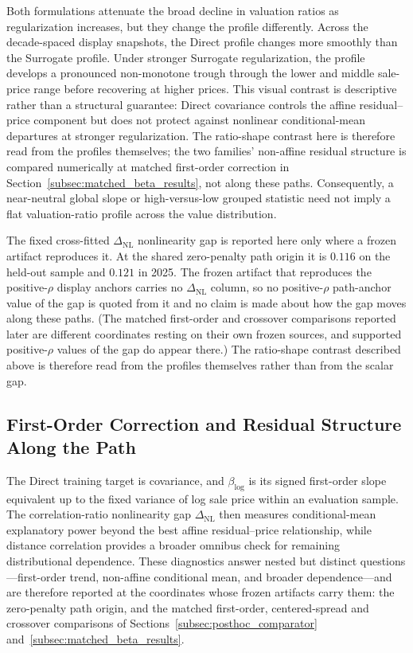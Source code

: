 \documentclass[10pt]{article}
\theoremstyle{definition}
\newcommand{\1}{\mathbf{1}}
\begin{document}
Both formulations attenuate the broad decline in valuation ratios as regularization
increases, but they change the profile differently.
Across the decade-spaced display snapshots, the Direct profile changes more smoothly than the Surrogate profile. Under stronger Surrogate regularization, the profile
develops a pronounced non-monotone trough through the lower and middle sale-price
range before recovering at higher prices. This visual contrast is descriptive rather than a structural guarantee: Direct covariance controls the affine residual--price component but does not protect against nonlinear conditional-mean departures at stronger regularization. The ratio-shape contrast here is therefore read from the profiles themselves; the two families' non-affine residual structure is compared numerically at matched first-order correction in Section~\ref{subsec:matched_beta_results}, not along these paths.
Consequently, a near-neutral global slope or high-versus-low grouped statistic need not imply a flat valuation-ratio profile across the value distribution.

The fixed cross-fitted $\Delta_{\mathrm{NL}}$ nonlinearity gap is reported here only where a frozen artifact reproduces it. At the shared zero-penalty path origin it is $0.116$ on the held-out sample and $0.121$ in 2025. The frozen artifact that reproduces the positive-$\rho$ display anchors carries no $\Delta_{\mathrm{NL}}$ column, so no positive-$\rho$ path-anchor value of the gap is quoted from it and no claim is made about how the gap moves along these paths. (The matched first-order and crossover comparisons reported later are different coordinates resting on their own frozen sources, and supported positive-$\rho$ values of the gap do appear there.) The ratio-shape contrast described above is therefore read from the profiles themselves rather than from the scalar gap.

\subsection{
\texorpdfstring{
First-Order Correction and Residual Structure Along the Path}{First-Order Correction and Residual Structure Along the Path}
}
\label{subsec:mechanism_results}


{The Direct training target is covariance, and $\beta_{\log}$ is its signed first-order slope equivalent up to the fixed variance of log sale price within an evaluation sample. The correlation-ratio nonlinearity gap $\Delta_{\mathrm{NL}}$ then measures conditional-mean explanatory power beyond the best affine residual--price relationship, while distance correlation provides a broader omnibus check for remaining distributional dependence. These diagnostics answer nested but distinct questions---first-order trend, non-affine conditional mean, and broader dependence---and are therefore reported at the coordinates whose frozen artifacts carry them: the zero-penalty path origin, and the matched first-order, centered-spread and crossover comparisons of Sections~\ref{subsec:posthoc_comparator} and~\ref{subsec:matched_beta_results}.}
\end{document}
